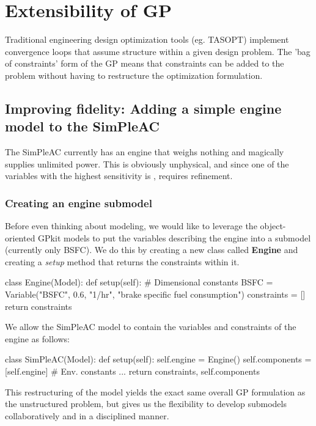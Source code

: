 \chapter{Extensibility of GP}

Traditional engineering design optimization tools (eg. TASOPT) implement
convergence loops that assume structure within a given design problem.
The 'bag of constraints' form of the GP means that constraints can be
added to the problem without
having to restructure the optimization formulation.

\section{Improving fidelity: Adding a simple engine model to the SimPleAC}
\label{s:engine}

The SimPleAC currently has an engine that weighs nothing and magically supplies
unlimited power. This is obviously unphysical, and since one of the variables
with the highest sensitivity is \BSFC, requires refinement.

\subsection{Creating an engine submodel}

Before even thinking about modeling, we would like to leverage the object-oriented 
GPkit models to put the variables describing the engine into a submodel (currently only 
BSFC). We do this by creating a new class called \textbf{Engine} and creating a \textit{setup}
method that returns the constraints within it.

\begin{python}
class Engine(Model):
    def setup(self):
        # Dimensional constants
        BSFC      = Variable("BSFC", 0.6, "1/hr", "brake specific fuel consumption")
        constraints = []
        return constraints    
\end{python}

We allow the SimPleAC model to contain the variables and constraints of the engine
as follows:

\begin{python}
class SimPleAC(Model):
    def setup(self):
        self.engine = Engine()
        self.components = [self.engine]
        # Env. constants
        ...
        return constraints, self.components
\end{python}

This restructuring of the model yields the exact same overall GP formulation 
as the unstructured problem, but gives us the flexibility to develop submodels
collaboratively and in a disciplined manner.

